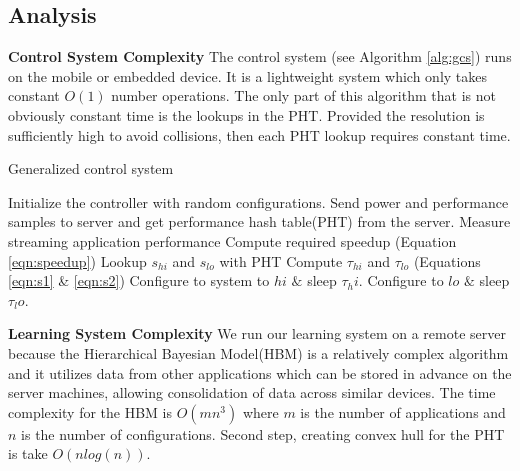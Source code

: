 \subsection{Analysis}

\noindent \textbf{Control System Complexity} The control system (see
Algorithm \ref{alg:gcs}) runs on the mobile or embedded device. It is
a lightweight system which only takes constant $O(1)$ number
operations.  The only part of this algorithm that is not obviously
constant time is the lookups in the PHT. Provided the resolution is
sufficiently high to avoid collisions, then each PHT lookup requires
constant time.
\begin{algorithm}
\caption{Generalized control system}
\label{alg:gcs}
\begin{algorithmic}
\REQUIRE Initialize the controller with random configurations. Send power and performance samples to server and get performance hash table(PHT) from the server.
    \STATE    Measure streaming application performance 
    \STATE    Compute required speedup (Equation \eqref{eqn:speedup})
    \STATE    Lookup $s_{hi}$ and $s_{lo}$ with PHT
    \STATE    Compute $\tau_{hi}$ and $\tau_{lo}$ (Equations \ref{eqn:s1} \& \ref{eqn:s2})
    \STATE    Configure to system to $hi$ $\&$ sleep $\tau_hi$.
    \STATE    Configure to $lo$ $\&$ sleep $\tau_lo$.
\ENDWHILE
\end{algorithmic}
\end{algorithm}


\noindent \textbf{Learning System Complexity} We run our learning
system on a remote server because the Hierarchical Bayesian Model(HBM)
is a relatively complex algorithm and it utilizes data from other
applications which can be stored in advance on the server machines,
allowing consolidation of data across similar devices.  The time
complexity for the HBM is $O(mn^3)$ where $m$ is the number of
applications and $n$ is the number of configurations.  Second step,
creating convex hull for the PHT is take $O(n log(n))$.

